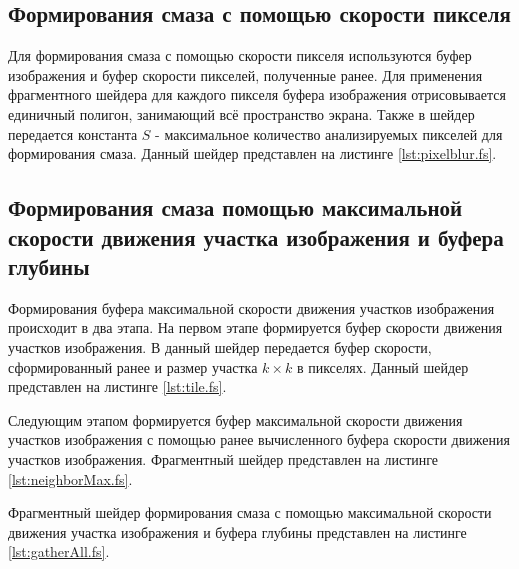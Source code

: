 % 



\subsection{Формирования смаза с помощью скорости пикселя}

Для формирования смаза с помощью скорости пикселя используются буфер изображения и буфер скорости пикселей, полученные ранее. Для применения фрагментного шейдера для каждого пикселя буфера изображения отрисовывается единичный полигон, занимающий всё пространство экрана. Также в шейдер передается константа $S$ - максимальное количество анализируемых пикселей для формирования смаза. Данный шейдер представлен на листинге \ref{lst:pixelblur.fs}. 




\subsection{Формирования смаза помощью максимальной скорости движения участка изображения и буфера глубины}

Формирования буфера максимальной скорости движения участков изображения происходит в два этапа. На первом этапе формируется буфер скорости движения участков изображения. В данный шейдер передается буфер скорости, сформированный ранее и размер участка $k \times k$ в пикселях. Данный шейдер представлен на листинге \ref{lst:tile.fs}. 




Следующим этапом формируется  буфер максимальной скорости движения участков изображения с помощью ранее вычисленного буфера  скорости движения участков изображения. Фрагментный шейдер представлен на листинге \ref{lst:neighborMax.fs}.



Фрагментный шейдер формирования смаза с помощью максимальной скорости движения участка изображения и буфера глубины представлен на листинге \ref{lst:gatherAll.fs}.


